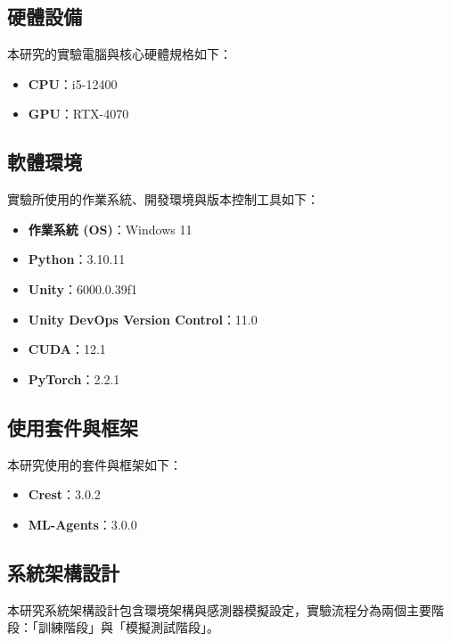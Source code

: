 \documentclass[12pt,a4paper]{article}
\begin{document}
\subsection{硬體設備}
本研究的實驗電腦與核心硬體規格如下：
\begin{itemize}
	\item \textbf{CPU}：i5-12400
  	\item \textbf{GPU}：RTX-4070
\end{itemize}

\subsection{軟體環境}
實驗所使用的作業系統、開發環境與版本控制工具如下：
\begin{itemize}
    \item \textbf{作業系統 (OS)}：Windows 11
    \item \textbf{Python}：3.10.11
    \item \textbf{Unity}：6000.0.39f1
    \item \textbf{Unity DevOps Version Control}：11.0
    \item \textbf{CUDA}：12.1
    \item \textbf{PyTorch}：2.2.1
\end{itemize}

\subsection{使用套件與框架}
本研究使用的套件與框架如下：
\begin{itemize}
    \item \textbf{Crest}：3.0.2
    \item \textbf{ML-Agents}：3.0.0
\end{itemize}

\newpage

\subsection{系統架構設計}
本研究系統架構設計包含環境架構與感測器模擬設定，實驗流程分為兩個主要階段：「訓練階段」與「模擬測試階段」。
\end{document}
